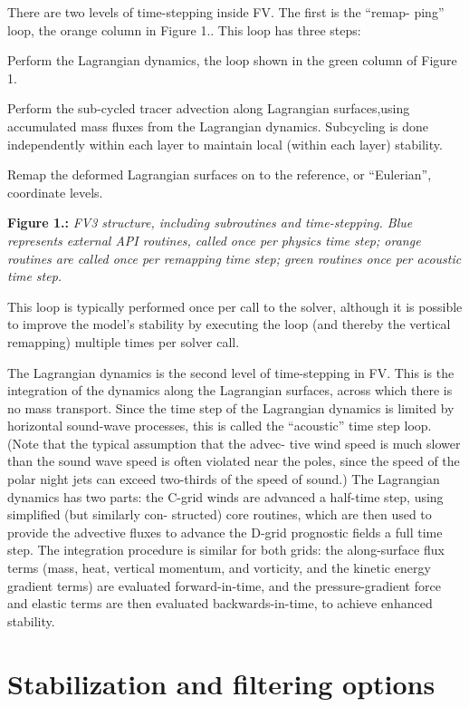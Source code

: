 There are two levels of time-\/stepping inside F\-V. The first is the “remap-\/ ping” loop, the orange column in Figure 1.. This loop has three steps\-:
\begin{DoxyEnumerate}
\item Perform the Lagrangian dynamics, the loop shown in the green column of Figure 1.
\item Perform the sub-\/cycled tracer advection along Lagrangian surfaces,using accumulated mass fluxes from the Lagrangian dynamics. Subcycling is done independently within each layer to maintain local (within each layer) stability.
\item Remap the deformed Lagrangian surfaces on to the reference, or “\-Eulerian”, coordinate levels.
\end{DoxyEnumerate}

 {\bfseries Figure 1.\-:} {\itshape F\-V3 structure, including subroutines and time-\/stepping. Blue represents external A\-P\-I routines, called once per physics time step; orange routines are called once per remapping time step; green routines once per acoustic time step.}

This loop is typically performed once per call to the solver, although it is possible to improve the model’s stability by executing the loop (and thereby the vertical remapping) multiple times per solver call.

The Lagrangian dynamics is the second level of time-\/stepping in F\-V. This is the integration of the dynamics along the Lagrangian surfaces, across which there is no mass transport. Since the time step of the Lagrangian dynamics is limited by horizontal sound-\/wave processes, this is called the “acoustic” time step loop. (Note that the typical assumption that the advec-\/ tive wind speed is much slower than the sound wave speed is often violated near the poles, since the speed of the polar night jets can exceed two-\/thirds of the speed of sound.) The Lagrangian dynamics has two parts\-: the C-\/grid winds are advanced a half-\/time step, using simplified (but similarly con-\/ structed) core routines, which are then used to provide the advective fluxes to advance the D-\/grid prognostic fields a full time step. The integration procedure is similar for both grids\-: the along-\/surface flux terms (mass, heat, vertical momentum, and vorticity, and the kinetic energy gradient terms) are evaluated forward-\/in-\/time, and the pressure-\/gradient force and elastic terms are then evaluated backwards-\/in-\/time, to achieve enhanced stability. \hypertarget{stabilization}{}\section{Stabilization and filtering options}\label{stabilization}
